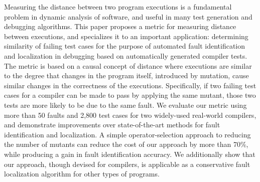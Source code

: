 Measuring the distance between two program executions is a fundamental problem in dynamic analysis of software, and useful in many test generation and debugging algorithms.  This paper proposes a metric for measuring distance between executions, and specializes it to an important application: determining similarity of failing test cases for the purpose of automated fault identification and localization in debugging based on automatically generated compiler tests.  The metric is based on a causal concept of distance where executions are similar to the degree that changes in the program itself, introduced by mutation, cause similar changes in the correctness of the executions.  Specifically, if two failing test cases for a compiler can be made to pass by applying the same mutant, those two tests are more likely to be due to the same fault.  We evaluate our metric using more than 50 faults and 2,800 test cases for two widely-used real-world compilers, and demonstrate improvements over state-of-the-art methods for fault identification and localization.  A simple operator-selection approach to reducing the number of mutants can reduce the cost of our approach by more than 70\%, while producing a gain in fault identification accuracy.  We additionally show that our approach, though devised for compilers, is applicable as a conservative fault localization algorithm for other types of programs.